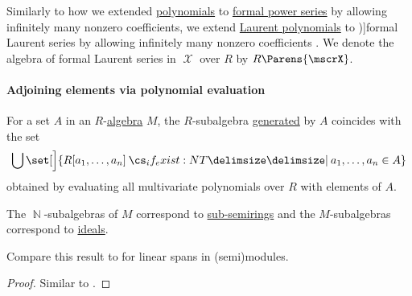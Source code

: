 \begin{definition}\label{def:formal_laurent_series}
  Similarly to how we extended \hyperref[def:polynomial_algebra/polynomials]{polynomials} to \hyperref[def:formal_power_series]{formal power series} by allowing infinitely many nonzero coefficients, we extend \hyperref[def:laurent_polynomial_algebra]{Laurent polynomials} to \term[ru=формальные ряды Лорана (\cite[23]{Шафаревич1999ОсновныеПонятияАлгебры})]{formal Laurent series} by allowing infinitely many nonzero coefficients . We denote the algebra of formal Laurent series in \( \mscrX \) over \( R \) by \( R\Parens{\mscrX} \).
\end{definition}

\paragraph{Adjoining elements via polynomial evaluation}

\begin{proposition}\label{thm:generators_via_polynomials}
  For a set \( A \) in an \( R \)-\hyperref[def:algebra_over_semiring]{algebra} \( M \), the \( R \)-subalgebra \hyperref[def:algebra_over_semiring/generated]{generated} by \( A \) coincides with the set
  \begin{equation*}
    \bigcup \set[\Big]{ R[a_1, \ldots, a_n] \given* a_1, \ldots, a_n \in A }
  \end{equation*}
  obtained by evaluating all multivariate polynomials over \( R \) with elements of \( A \).
\end{proposition}
\begin{comments}
  \item The \( \BbbN \)-subalgebras of \( M \) correspond to \hyperref[def:semiring/submodel]{sub-semirings} and the \( M \)-subalgebras correspond to \hyperref[def:semiring_ideal]{ideals}.

  \item Compare this result to  for linear spans in (semi)modules.
\end{comments}
\begin{proof}
  Similar to .
\end{proof}

